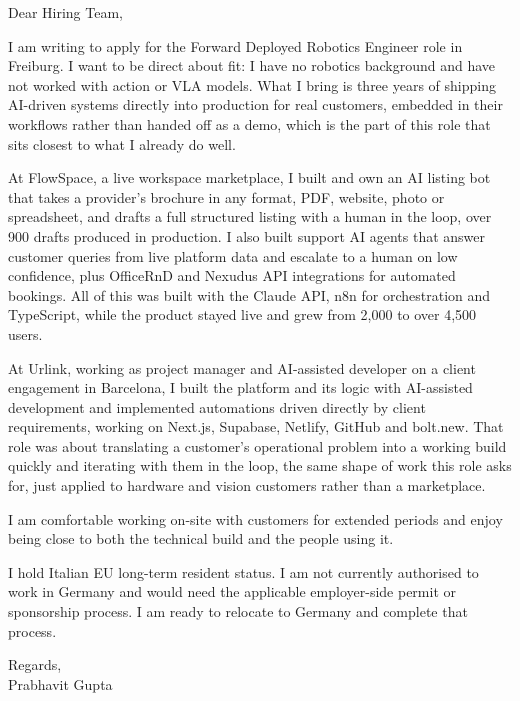 \documentclass[a4paper,11pt]{article}
\begin{document}
Dear Hiring Team,

I am writing to apply for the Forward Deployed Robotics Engineer role in Freiburg. I want to be direct about fit: I have no robotics background and have not worked with action or VLA models. What I bring is three years of shipping AI-driven systems directly into production for real customers, embedded in their workflows rather than handed off as a demo, which is the part of this role that sits closest to what I already do well.

At FlowSpace, a live workspace marketplace, I built and own an AI listing bot that takes a provider's brochure in any format, PDF, website, photo or spreadsheet, and drafts a full structured listing with a human in the loop, over 900 drafts produced in production. I also built support AI agents that answer customer queries from live platform data and escalate to a human on low confidence, plus OfficeRnD and Nexudus API integrations for automated bookings. All of this was built with the Claude API, n8n for orchestration and TypeScript, while the product stayed live and grew from 2,000 to over 4,500 users.

At Urlink, working as project manager and AI-assisted developer on a client engagement in Barcelona, I built the platform and its logic with AI-assisted development and implemented automations driven directly by client requirements, working on Next.js, Supabase, Netlify, GitHub and bolt.new. That role was about translating a customer's operational problem into a working build quickly and iterating with them in the loop, the same shape of work this role asks for, just applied to hardware and vision customers rather than a marketplace.

I am comfortable working on-site with customers for extended periods and enjoy being close to both the technical build and the people using it.

I hold Italian EU long-term resident status. I am not currently authorised to work in Germany and would need the applicable employer-side permit or sponsorship process. I am ready to relocate to Germany and complete that process.

Regards,\\
Prabhavit Gupta
\end{document}
